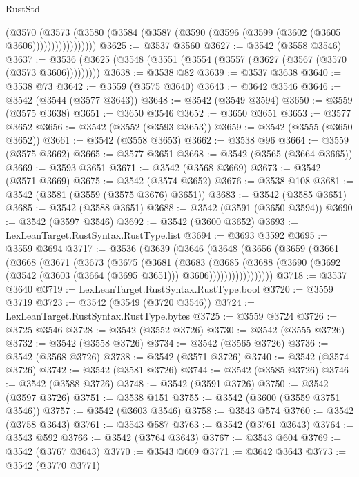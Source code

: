 \begin{lexlean}{RustStd}
\begin{coremodule}
                  (@3570
                    (@3573
                      (@3580 (@3584 (@3587 (@3590 (@3596 (@3599 (@3602 (@3605 @3606)))))))))))))))))
@3625 := @3537 @3560
@3627 := @3542 (@3558 @3546)
@3637 := @3536 (@3625 (@3548 (@3551 (@3554 (@3557 (@3627 (@3567 (@3570 (@3573 @3606)))))))))
@3638 := @3538 @82
@3639 := @3537 @3638
@3640 := @3538 @73
@3642 := @3559 (@3575 @3640)
@3643 := @3642 @3546
@3646 := @3542 (@3544 (@3577 @3643))
@3648 := @3542 (@3549 @3594)
@3650 := @3559 (@3575 @3638)
@3651 := @3650 @3546
@3652 := @3650 @3651
@3653 := @3577 @3652
@3656 := @3542 (@3552 (@3593 @3653))
@3659 := @3542 (@3555 (@3650 @3652))
@3661 := @3542 (@3558 @3653)
@3662 := @3538 @96
@3664 := @3559 (@3575 @3662)
@3665 := @3577 @3651
@3668 := @3542 (@3565 (@3664 @3665))
@3669 := @3593 @3651
@3671 := @3542 (@3568 @3669)
@3673 := @3542 (@3571 @3669)
@3675 := @3542 (@3574 @3652)
@3676 := @3538 @108
@3681 := @3542 (@3581 (@3559 (@3575 @3676) @3651))
@3683 := @3542 (@3585 @3651)
@3685 := @3542 (@3588 @3651)
@3688 := @3542 (@3591 (@3650 @3594))
@3690 := @3542 (@3597 @3546)
@3692 := @3542 (@3600 @3652)
@3693 := LexLeanTarget.RustSyntax.RustType.list
@3694 := @3693 @3592
@3695 := @3559 @3694
@3717 := @3536
    (@3639
      (@3646
        (@3648
          (@3656
            (@3659
              (@3661
                (@3668
                  (@3671
                    (@3673
                      (@3675
                        (@3681
                          (@3683
                            (@3685
                              (@3688
                                (@3690
                                  (@3692 (@3542 (@3603 (@3664 (@3695 @3651))) @3606)))))))))))))))))
@3718 := @3537 @3640
@3719 := LexLeanTarget.RustSyntax.RustType.bool
@3720 := @3559 @3719
@3723 := @3542 (@3549 (@3720 @3546))
@3724 := LexLeanTarget.RustSyntax.RustType.bytes
@3725 := @3559 @3724
@3726 := @3725 @3546
@3728 := @3542 (@3552 @3726)
@3730 := @3542 (@3555 @3726)
@3732 := @3542 (@3558 @3726)
@3734 := @3542 (@3565 @3726)
@3736 := @3542 (@3568 @3726)
@3738 := @3542 (@3571 @3726)
@3740 := @3542 (@3574 @3726)
@3742 := @3542 (@3581 @3726)
@3744 := @3542 (@3585 @3726)
@3746 := @3542 (@3588 @3726)
@3748 := @3542 (@3591 @3726)
@3750 := @3542 (@3597 @3726)
@3751 := @3538 @151
@3755 := @3542 (@3600 (@3559 @3751 @3546))
@3757 := @3542 (@3603 @3546)
@3758 := @3543 @574
@3760 := @3542 (@3758 @3643)
@3761 := @3543 @587
@3763 := @3542 (@3761 @3643)
@3764 := @3543 @592
@3766 := @3542 (@3764 @3643)
@3767 := @3543 @604
@3769 := @3542 (@3767 @3643)
@3770 := @3543 @609
@3771 := @3642 @3643
@3773 := @3542 (@3770 @3771)

\end{coremodule}
\end{lexlean}
